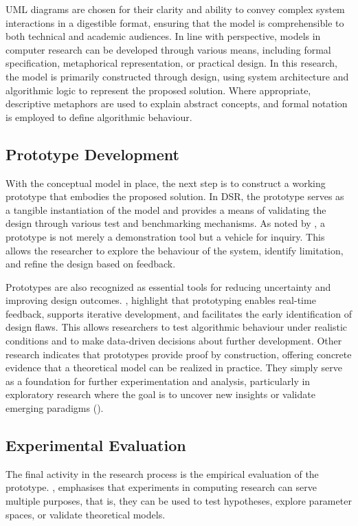 \parbreak\noindent UML diagrams are chosen for their clarity and ability to convey complex system interactions in a digestible format, ensuring that the model is comprehensible to both technical and academic audiences. In line with \cite{olivier2009information} perspective, models in computer research can be developed through various means, including formal specification, metaphorical representation, or practical design. In this research, the model is primarily constructed through design, using system architecture and algorithmic logic to represent the proposed solution. Where appropriate, descriptive metaphors are used to explain abstract concepts, and formal notation is employed to define algorithmic behaviour.

\subsection{Prototype Development}
With the conceptual model in place, the next step is to construct a working prototype that embodies the proposed solution. In DSR, the prototype serves as a tangible instantiation of the model and provides a means of validating the design through various test and benchmarking mechanisms. As noted by \cite{olivier2009information}, a prototype is not merely a demonstration tool but a vehicle for inquiry. This allows the researcher to explore the behaviour of the system, identify limitation, and refine the design based on feedback.

\parbreak\noindent Prototypes are also recognized as essential tools for reducing uncertainty and improving design outcomes. \cite{camburn2017design}, highlight that prototyping enables real-time feedback, supports iterative development, and facilitates the early identification of design flaws. This allows researchers to test algorithmic behaviour under realistic conditions and to make data-driven decisions about further development. Other research indicates that prototypes provide proof by construction, offering concrete evidence that a theoretical model can be realized in practice. They simply serve as a foundation for further experimentation and analysis, particularly in exploratory research where the goal is to uncover new insights or validate emerging paradigms (\cite{nunamaker1990systems}).

\subsection{Experimental Evaluation}
The final activity in the research process is the empirical evaluation of the prototype. \cite{olivier2009information}, emphasises that experiments in computing research can serve multiple purposes, that is, they can be used to test hypotheses, explore parameter spaces, or validate theoretical models.

